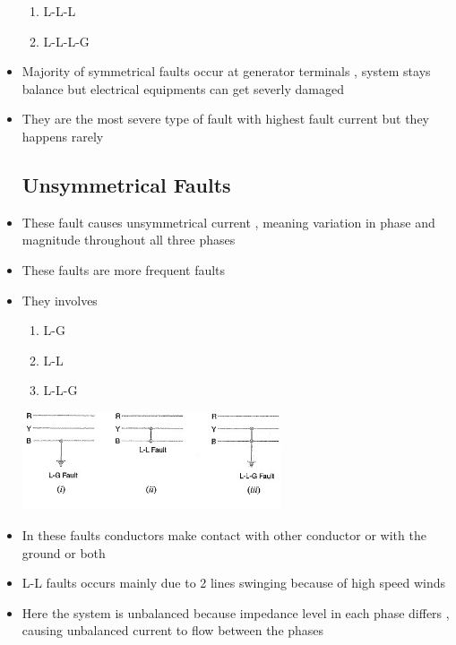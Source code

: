 \documentclass[14pt ,a4paper]{extarticle}
\begin{document}
\begin{itemize}
        \begin{enumerate}
            \item{L-L-L}
            \item{L-L-L-G}
        \end{enumerate}
    \item{Majority of symmetrical faults occur at generator terminals , system stays balance but electrical equipments can get severly damaged}
    \item{They are the most severe type of fault with highest fault current but they happens rarely}
        \subsection{Unsymmetrical Faults}
    
    \item{These fault causes unsymmetrical current , meaning variation in phase and magnitude throughout all three phases }

    \item{These faults are more frequent faults }
    \item{They involves}
        \begin{enumerate}
            
            \item{L-G} 
            \item{L-L} 
            \item{L-L-G} 
            
        \end{enumerate}
        \begin{center}
                \includegraphics[width=0.6\textwidth]{./assets/Unsymmetrical-Faults-on-Three-Power-System.jpg}
            \end{center}    
    \item{In these faults conductors make contact with other conductor or with the ground or both}
    \item{L-L faults occurs mainly due to 2 lines swinging because of high speed winds}
    \item{Here the system is unbalanced because impedance level in each phase differs , causing unbalanced current to flow between the phases}
        
\end{itemize}
\end{document}
